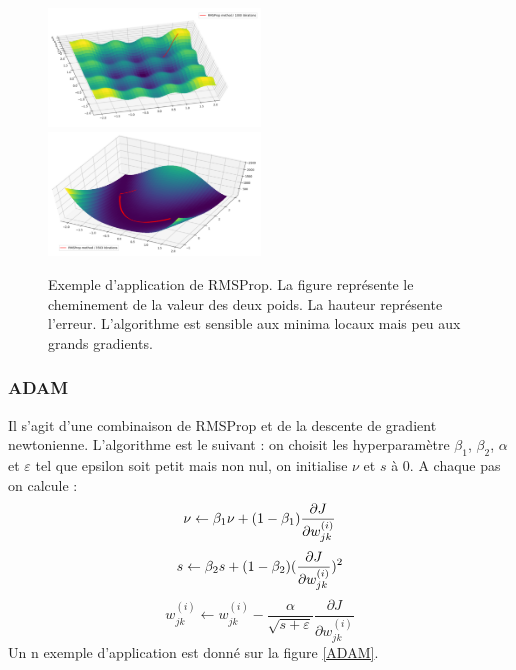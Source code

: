 \begin{figure}[!h]
\centering
\includegraphics[width=160pt]{"images/MLP/RMSProp"}
\hspace*{5mm}
\includegraphics[width=160pt]{"images/MLP/RMSPropPropre"}
\caption{Exemple d'application de RMSProp. La figure représente le cheminement de la valeur des deux poids. La hauteur représente l'erreur. L'algorithme est sensible aux minima locaux mais peu aux grands gradients.}
\label{RMSProp}
\end{figure}

\subsubsection{ADAM}
Il s'agit d'une combinaison de RMSProp et de la descente de gradient newtonienne.
L'algorithme est le suivant : on choisit les hyperparamètre $\beta_1$, $\beta_2$,  $\alpha$ et $\varepsilon$ tel que epsilon soit petit mais non nul, on initialise $\nu$ et $s$ à 0.
A chaque pas on calcule :
\begin{displaymath}
\nu \leftarrow \beta_1 \nu + (1-\beta_1) \frac{\partial J}{\partial w_{jk}^{(i)}} \\
\end{displaymath}
\begin{displaymath}
s \leftarrow \beta_2 s + (1-\beta_2) (\frac{\partial J}{\partial w_{jk}^{(i)}})^2 \\
\end{displaymath}
\begin{displaymath}
w_{jk}^{(i)} \leftarrow w_{jk}^{(i)} - \frac{\alpha}{\sqrt{s+\varepsilon}}\frac{\partial J}{\partial w_{jk}^{(i)}}
\end{displaymath}
Un n exemple d'application est donné sur la figure \ref{ADAM}.

